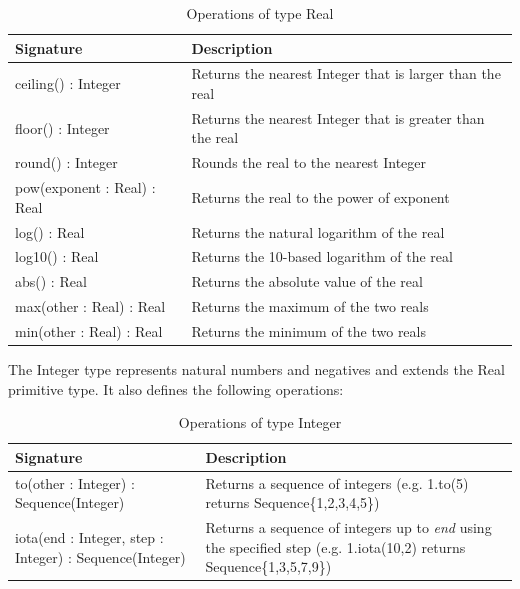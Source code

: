 \begin{longtable} {|p{5.5cm}|p{6.5cm}|}
			
			\caption{Operations of type Real}
			\label{tab:RealOperations}\\
			
			\hline
			
			\textbf{Signature} & \textbf{Description} \\\hline

			ceiling() : Integer & Returns the nearest Integer that is larger than the real\\\hline
			
			floor() : Integer & Returns the nearest Integer that is greater than the real\\\hline
			
			round() : Integer & Rounds the real to the nearest Integer\\\hline
			
			pow(exponent : Real) : Real & Returns the real to the power of exponent \\\hline
			
			log() : Real & Returns the natural logarithm of the real \\\hline
			
			log10() : Real & Returns the 10-based logarithm of the real \\\hline 
			
			abs() : Real & Returns the absolute value of the real \\\hline
			
			max(other : Real) : Real & Returns the maximum of the two reals \\\hline
			
			min(other : Real) : Real & Returns the minimum of the two reals \\\hline
			
\end{longtable}

The Integer type represents natural numbers and negatives and extends the Real primitive type. It also defines the following operations:

\begin{longtable} {|p{5.5cm}|p{6.5cm}|}
			
			\caption{Operations of type Integer}
			\label{tab:IntegerOperations}\\
			
			\hline
							
			\textbf{Signature} & \textbf{Description} \\\hline

			to(other : Integer) : Sequence(Integer) & Returns a sequence of integers (e.g. 1.to(5) returns Sequence\{1,2,3,4,5\})\\\hline
			
			iota(end : Integer, step : Integer) : Sequence(Integer) & Returns a sequence of integers up to \emph{end} using the specified step (e.g. 1.iota(10,2) returns Sequence\{1,3,5,7,9\})\\\hline
			
\end{longtable}

